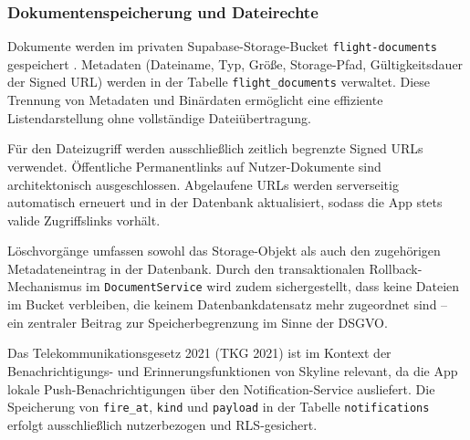 \subsubsection{Dokumentenspeicherung und Dateirechte}

Dokumente werden im privaten Supabase-Storage-Bucket
\texttt{flight-documents} gespeichert \cite{supabaseStorage}.
Metadaten (Dateiname, Typ, Größe, Storage-Pfad, Gültigkeitsdauer
der Signed URL) werden in der Tabelle \texttt{flight\_documents}
verwaltet.
Diese Trennung von Metadaten und Binärdaten ermöglicht eine
effiziente Listendarstellung ohne vollständige Dateiübertragung.

Für den Dateizugriff werden ausschließlich zeitlich begrenzte
Signed URLs verwendet.
Öffentliche Permanentlinks auf Nutzer-Dokumente sind
architektonisch ausgeschlossen.
Abgelaufene URLs werden serverseitig automatisch erneuert
und in der Datenbank aktualisiert, sodass die App stets
valide Zugriffslinks vorhält.

Löschvorgänge umfassen sowohl das Storage-Objekt als auch
den zugehörigen Metadateneintrag in der Datenbank.
Durch den transaktionalen Rollback-Mechanismus im
\texttt{DocumentService} wird zudem sichergestellt,
dass keine Dateien im Bucket verbleiben, die keinem
Datenbankdatensatz mehr zugeordnet sind -- ein zentraler
Beitrag zur Speicherbegrenzung im Sinne der DSGVO.

Das Telekommunikationsgesetz 2021 (TKG 2021) \cite{tkg2021}
ist im Kontext der Benachrichtigungs- und Erinnerungsfunktionen
von Skyline relevant, da die App lokale Push-Benachrichtigungen
über den Notification-Service ausliefert.
Die Speicherung von \texttt{fire\_at}, \texttt{kind} und
\texttt{payload} in der Tabelle \texttt{notifications} erfolgt
ausschließlich nutzerbezogen und RLS-gesichert.
